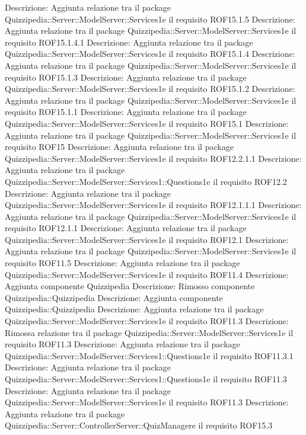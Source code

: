 Descrizione: Aggiunta relazione tra il package Quizzipedia::Server::ModelServer::Services1e il requisito ROF15.1.5 
Descrizione: Aggiunta relazione tra il package Quizzipedia::Server::ModelServer::Services1e il requisito ROF15.1.4.1 
Descrizione: Aggiunta relazione tra il package Quizzipedia::Server::ModelServer::Services1e il requisito ROF15.1.4 
Descrizione: Aggiunta relazione tra il package Quizzipedia::Server::ModelServer::Services1e il requisito ROF15.1.3 
Descrizione: Aggiunta relazione tra il package Quizzipedia::Server::ModelServer::Services1e il requisito ROF15.1.2 
Descrizione: Aggiunta relazione tra il package Quizzipedia::Server::ModelServer::Services1e il requisito ROF15.1.1 
Descrizione: Aggiunta relazione tra il package Quizzipedia::Server::ModelServer::Services1e il requisito ROF15.1 
Descrizione: Aggiunta relazione tra il package Quizzipedia::Server::ModelServer::Services1e il requisito ROF15 
Descrizione: Aggiunta relazione tra il package Quizzipedia::Server::ModelServer::Services1e il requisito ROF12.2.1.1 
Descrizione: Aggiunta relazione tra il package Quizzipedia::Server::ModelServer::Services1::Questions1e il requisito ROF12.2 
Descrizione: Aggiunta relazione tra il package Quizzipedia::Server::ModelServer::Services1e il requisito ROF12.1.1.1 
Descrizione: Aggiunta relazione tra il package Quizzipedia::Server::ModelServer::Services1e il requisito ROF12.1.1 
Descrizione: Aggiunta relazione tra il package Quizzipedia::Server::ModelServer::Services1e il requisito ROF12.1 
Descrizione: Aggiunta relazione tra il package Quizzipedia::Server::ModelServer::Services1e il requisito ROF11.5 
Descrizione: Aggiunta relazione tra il package Quizzipedia::Server::ModelServer::Services1e il requisito ROF11.4 
Descrizione: Aggiunta componente Quizzipedia 
Descrizione: Rimosso componente Quizzipedia::Quizzipedia 
Descrizione: Aggiunta componente Quizzipedia::Quizzipedia 
Descrizione: Aggiunta relazione tra il package Quizzipedia::Server::ModelServer::Services1e il requisito ROF11.3 
Descrizione: Rimossa relazione tra il package Quizzipedia::Server::ModelServer::Services1e il requisito ROF11.3 
Descrizione: Aggiunta relazione tra il package Quizzipedia::Server::ModelServer::Services1::Questions1e il requisito ROF11.3.1 
Descrizione: Aggiunta relazione tra il package Quizzipedia::Server::ModelServer::Services1::Questions1e il requisito ROF11.3 
Descrizione: Aggiunta relazione tra il package Quizzipedia::Server::ModelServer::Services1e il requisito ROF11.3 
Descrizione: Aggiunta relazione tra il package Quizzipedia::Server::ControllerServer::QuizManagere il requisito ROF15.3 
